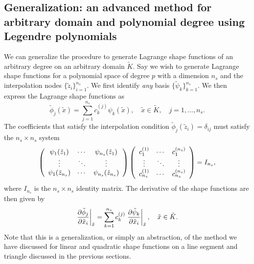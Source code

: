 \subsection{Generalization: an advanced method for arbitrary domain and polynomial degree using Legendre polynomials}
\label{sec:fe_gen_shape}
We can generalize the procedure to generate Lagrange shape functions of an arbitrary degree on an arbitrary domain $\tilde K$.  Say we wish to generate Lagrange shape functions for a polynomial space of degree $p$ with a dimension $n_s$ and the interpolation nodes $\{ \tilde z_i \}_{i=1}^{n_s}$.  We first identify \emph{any} basis $\{ \tilde \psi_k \}_{k=1}^{n_s}$.  We then express the Lagrange shape functions as
\begin{equation}
  \tilde \phi_j(\tilde x) = \sum_{j=1}^{n_s} c^{(j)}_k \psi_k(\tilde x), \quad \tilde x \in \tilde K, \quad j = 1,\dots,n_s.
  \label{eq:fe_gen_val_rep}
\end{equation}
The coefficients that satisfy the interpolation condition $\tilde \phi_j(\tilde z_i) = \delta_{ij}$ must satisfy the $n_s \times n_s$ system
\begin{align}
  \bmat{ccc}
  \psi_1(\tilde z_1) & \cdots & \psi_{n_s}(\tilde z_1) \\
  \vdots & \ddots & \vdots \\
  \psi_1(\tilde z_{n_s}) & \cdots & \psi_{n_s}(\tilde z_{n_s}) 
  \emat
  \bmat{ccc}
  c^{(1)}_1 & \cdots & c^{(n_s)}_1 \\
  \vdots & \ddots & \vdots \\
  c^{(1)}_{n_s} & \cdots & c^{(n_s)}_{n_s}
  \emat
  =
  I_{n_s},
  \label{eq:fe_gen_coeff_sys}
\end{align}
where $I_{n_s}$ is the $n_s \times n_s$ identity matrix. The derivative of the shape functions are then given by
\begin{equation}
  \left. \pp{\tilde \phi_j}{\tilde x_i} \right|_{\tilde x}
  = \sum_{k=1}^{n_s} c^{(j)}_k \left. \pp{\tilde \psi_k}{\tilde x_i} \right|_{\tilde x}, \quad \tilde x \in \tilde K.
  \label{eq:fe_gen_der_rep}
\end{equation}
Note that this is a generalization, or simply an abstraction, of the method we have discussed for linear and quadratic shape functions on a line segment and triangle discussed in the previous sections.

